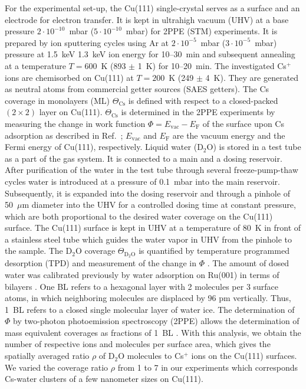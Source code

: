 \documentclass[aps,twocolumn,amssymb,amsfonts,amsmath,showpacs,final,a4paper,superscriptaddress]{revtex4-2}
\begin{document}
For the experimental set-up, the Cu(111) single-crystal serves as a surface and an electrode for electron transfer. It is kept in ultrahigh vacuum (UHV) at a base pressure $2 \cdot 10^{-10}$~mbar ($5 \cdot 10^{-10}$~mbar) for 2PPE (STM) experiments. It is prepared by ion sputtering cycles using Ar at $2 \cdot 10^{-5}$~mbar ($3 \cdot 10^{-5}$~mbar) pressure at 1.5~keV 1.3~keV ion energy for 10--30~min and subsequent annealing at a temperature $T = 600$~K {(893 $\pm$ 1~K)} for 10--20~min. The investigated Cs$^+$ ions are chemisorbed on Cu(111) at $T = 200$~K {(249 $\pm$ 4~K)}. They are generated as neutral atoms from commercial getter sources (SAES getters). The Cs coverage in monolayers (ML) $\Theta_{\mathrm{Cs}}$ is defined with respect to a closed-packed $(2\times 2)$ layer on Cu(111). $\Theta _{\mathrm{Cs}}$ is determined {in the 2PPE experiments} by measuring the change in work function $\Phi=E_{\mathrm{vac}}-E_{\mathrm{F}}$ of the surface upon Cs adsorption as described in Ref.~\cite{lu_1996}; $E_{\mathrm{vac}}$ and $E_{\mathrm{F}}$ are the vacuum energy and the Fermi energy of Cu(111), respectively. Liquid water (D$_2$O) is stored in a test tube as a part of the gas system. It is connected to a main and a dosing reservoir. After purification of the water in the test tube through several freeze-pump-thaw cycles water is introduced at a pressure of 0.1~mbar into the main reservoir. Subsequently, it is expanded into the dosing reservoir and through a pinhole of 50~$\mu$m diameter into the UHV for a controlled dosing time at constant pressure, which are both proportional to the desired water coverage on the Cu(111) surface. The Cu(111) surface is kept in UHV at a temperature of 80~K in front of a stainless steel tube which guides the water vapor in UHV from the pinhole to the sample. The D$_2$O coverage $\Theta_{\mathrm{D_2O}}$ is quantified by temperature programmed desorption (TPD) and measurement of the change in $\Phi$ \cite{bovensiepen_2003}. The amount of dosed water was calibrated previously by water adsorption on Ru(001) in terms of bilayers \cite{bovensiepen_2003}. One BL refers to a hexagonal layer with 2 molecules per 3 surface atoms, in which neighboring molecules are displaced by 96 pm vertically. Thus, 1~BL refers to a closed single molecular layer of water ice. The determination of $\Phi$ by two-photon photoemission spectroscopy (2PPE) allows the determination of mass equivalent coverages as fractions of 1~BL \cite{bovensiepen_2003}. With this analysis, we obtain the number of respective ions and molecules per surface area, which gives the spatially averaged ratio $\rho$ of D$_2$O molecules to Cs$^+$ ions on the Cu(111) surfaces. We varied the coverage ratio  $\rho$ from 1 to 7 in our experiments which corresponds Cs-water clusters of a few nanometer sizes on Cu(111).
\end{document}
